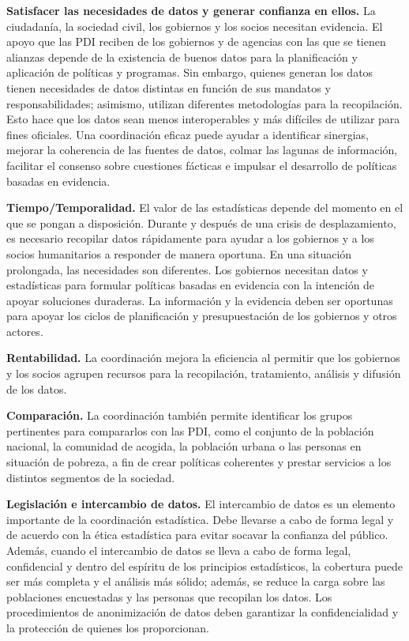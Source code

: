 \documentclass[
]{book}
\begin{document}
\textbf{Satisfacer las necesidades de datos y generar confianza en ellos.} La ciudadanía, la sociedad civil, los gobiernos y los socios necesitan evidencia. El apoyo que las PDI reciben de los gobiernos y de agencias con las que se tienen alianzas depende de la existencia de buenos datos para la planificación y aplicación de políticas y programas. Sin embargo, quienes generan los datos tienen necesidades de datos distintas en función de sus mandatos y responsabilidades; asimismo, utilizan diferentes metodologías para la recopilación. Esto hace que los datos sean menos interoperables y más difíciles de utilizar para fines oficiales. Una coordinación eficaz puede ayudar a identificar sinergias, mejorar la coherencia de las fuentes de datos, colmar las lagunas de información, facilitar el consenso sobre cuestiones fácticas e impulsar el desarrollo de políticas basadas en evidencia.

\textbf{Tiempo/Temporalidad.} El valor de las estadísticas depende del momento en el que se pongan a disposición. Durante y después de una crisis de desplazamiento, es necesario recopilar datos rápidamente para ayudar a los gobiernos y a los socios humanitarios a responder de manera oportuna. En una situación prolongada, las necesidades son diferentes. Los gobiernos necesitan datos y estadísticas para formular políticas basadas en evidencia con la intención de apoyar soluciones duraderas. La información y la evidencia deben ser oportunas para apoyar los ciclos de planificación y presupuestación de los gobiernos y otros actores.

\textbf{Rentabilidad.} La coordinación mejora la eficiencia al permitir que los gobiernos y los socios agrupen recursos para la recopilación, tratamiento, análisis y difusión de los datos.

\textbf{Comparación.} La coordinación también permite identificar los grupos pertinentes para compararlos con las PDI, como el conjunto de la población nacional, la comunidad de acogida, la población urbana o las personas en situación de pobreza, a fin de crear políticas coherentes y prestar servicios a los distintos segmentos de la sociedad.

\textbf{Legislación e intercambio de datos.} El intercambio de datos es un elemento importante de la coordinación estadística. Debe llevarse a cabo de forma legal y de acuerdo con la ética estadística para evitar socavar la confianza del público. Además, cuando el intercambio de datos se lleva a cabo de forma legal, confidencial y dentro del espíritu de los principios estadísticos, la cobertura puede ser más completa y el análisis más sólido; además, se reduce la carga sobre las poblaciones encuestadas y las personas que recopilan los datos. Los procedimientos de anonimización de datos deben garantizar la confidencialidad y la protección de quienes los proporcionan.
\end{document}
